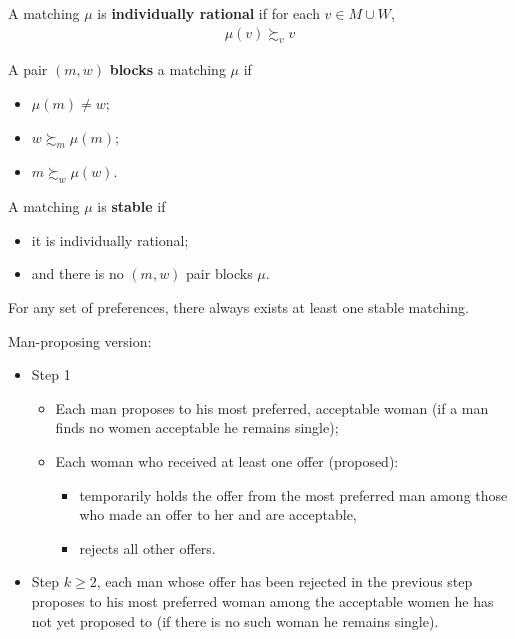\documentclass{article}
\begin{document}
	\begin{definition}
		A matching $\mu$ is \textbf{individually rational} if for each $v \in M \cup W$,
		\begin{align}
			\mu(v) \succsim_v v
		\end{align}
	\end{definition}
	
	\begin{definition}
		A pair $(m, w)$ \textbf{blocks} a matching $\mu$ if
		\begin{itemize}
			\item $\mu(m) \neq w$;
			\item $w \succsim_m \mu(m)$;
			\item $m \succsim_w \mu(w)$.
		\end{itemize}
	\end{definition}
	
	\begin{definition}
		A matching $\mu$ is \textbf{stable} if
		\begin{itemize}
			\item it is individually rational;
			\item and there is no $(m, w)$ pair blocks $\mu$.
		\end{itemize}
	\end{definition}
	
	\begin{theorem}
		For any set of preferences, there always exists at least one stable matching.
	\end{theorem}
	
	\begin{algorithm} Man-proposing version:
		\begin{itemize}
			\item Step 1
			\begin{itemize}
				\item Each man proposes to his most preferred, acceptable woman (if a man finds no women acceptable he remains single);
				\item Each woman who received at least one offer (proposed):
				\begin{itemize}
					\item temporarily holds the offer from the most preferred man among those who made an offer to her and are acceptable,
					\item rejects all other offers.
				\end{itemize}
			\end{itemize}
			\item Step $k \geq 2$, each man whose offer has been rejected in the previous step proposes to his most preferred woman among the acceptable women he has not yet proposed to (if there is no such woman he remains single).
		\end{itemize}
	\end{algorithm}
	
\end{document}
